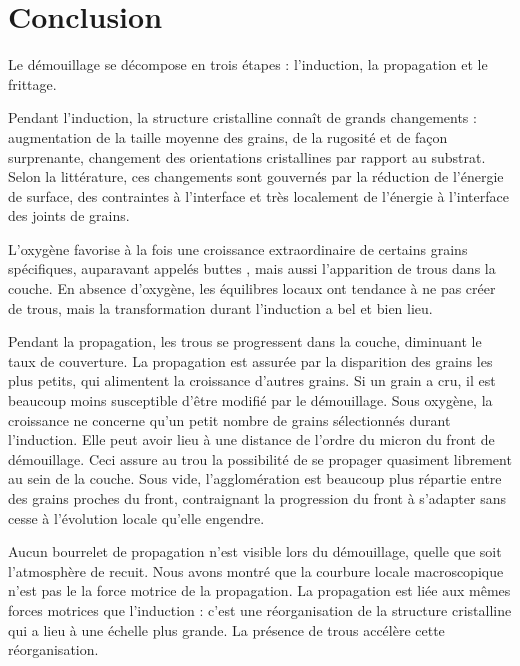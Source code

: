 \section{Conclusion}
Le démouillage se décompose en trois étapes : l'induction, la propagation et le frittage.\par 
Pendant l'induction, la structure cristalline connaît de grands changements : augmentation de la taille moyenne des grains, de la rugosité et de façon surprenante, changement des orientations cristallines par rapport au substrat. Selon la littérature, ces changements sont gouvernés par la réduction de l'énergie de surface, des contraintes à l'interface et très localement de l'énergie à l'interface des joints de grains.\par 
L'oxygène favorise à la fois une croissance extraordinaire de certains grains spécifiques, auparavant appelés \og buttes \fg, mais aussi l'apparition de trous dans la couche. En absence d'oxygène, les équilibres locaux ont tendance à ne pas créer de trous, mais la transformation durant l'induction a bel et bien lieu.\par 
Pendant la propagation, les trous se progressent dans la couche, diminuant le taux de couverture. La propagation est assurée par la disparition des grains les plus petits, qui alimentent la croissance d'autres grains. Si un grain a cru, il est beaucoup moins susceptible d'être modifié par le démouillage. Sous oxygène, la croissance ne concerne qu'un petit nombre de grains sélectionnés durant l'induction. Elle peut avoir lieu à une distance de l'ordre du micron du front de démouillage. Ceci assure au trou la possibilité de se propager quasiment librement au sein de la couche. Sous vide, l'agglomération est beaucoup plus répartie entre des grains proches du front, contraignant la progression du front à s'adapter sans cesse à l'évolution locale qu'elle engendre.\par 
Aucun bourrelet de propagation n'est visible lors du démouillage, quelle que soit l'atmosphère de recuit. Nous avons montré que la courbure locale \og macroscopique \fg{}  n'est pas le la force motrice de la propagation. La propagation est liée aux mêmes forces motrices que l'induction : c'est une réorganisation de la structure cristalline qui a lieu à une échelle plus grande. La présence de trous accélère cette réorganisation.\par 
